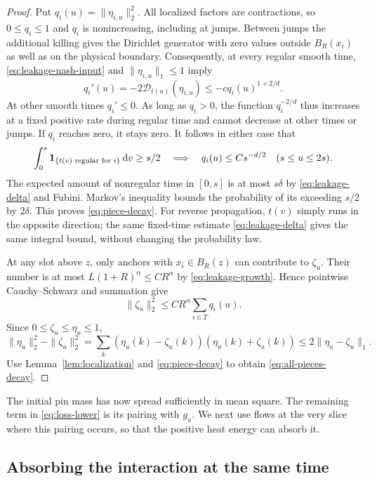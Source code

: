 \begin{proof}
Put $q_i(u)=\|\eta_{i,u}\|_2^2$.  All localized factors are
contractions, so $0\le q_i\le1$ and $q_i$ is nonincreasing,
including at jumps.  Between jumps the additional killing gives the
Dirichlet generator with zero values outside $B_R(x_i)$ as well as
on the physical boundary.  Consequently, at every regular smooth
time, \eqref{eq:leakage-nash-input} and
$\|\eta_{i,u}\|_1\le1$ imply
\begin{equation}\label{eq:nash-differential}
 q_i'(u)=-2\mathcal D_{t(u)}(\eta_{i,u})
                         \le-c q_i(u)^{1+2/d}.
\end{equation}
At other smooth times $q_i'\le0$.
As long as $q_i>0$, the function $q_i^{-2/d}$ thus increases at a
fixed positive rate during regular time and cannot decrease at other
times or jumps.  If $q_i$ reaches zero, it stays zero.  It follows in
either case that
\[
 \int_0^s\mathbf 1_{\{t(v)\text{ regular for }i\}}\,\mathrm dv\ge s/2
 \quad\Longrightarrow\quad
 q_i(u)\le C s^{-d/2}\quad(s\le u\le2s).
\]
The expected amount of nonregular time in $[0,s]$ is at most
$s\delta$ by \eqref{eq:leakage-delta} and Fubini.  Markov's
inequality bounds the probability of its exceeding $s/2$ by
$2\delta$.  This proves \eqref{eq:piece-decay}.  For reverse
propagation, $t(v)$ simply runs in the opposite direction; the same
fixed-time estimate \eqref{eq:leakage-delta} gives the same integral
bound, without changing the probability law.

At any slot above $z$, only anchors with $x_i\in B_R(z)$ can
contribute to $\zeta_u$.  Their number is at most
$L(1+R)^\alpha\le C R^\alpha$ by
\eqref{eq:leakage-growth}.  Hence pointwise Cauchy--Schwarz and
summation give
\[
                \|\zeta_u\|_2^2\le C R^\alpha\sum_{i\in T}q_i(u).
\]
Since $0\le\zeta_u\le\eta_u\le1$,
\[
 \|\eta_u\|_2^2-\|\zeta_u\|_2^2
       =\sum_k(\eta_u(k)-\zeta_u(k))(\eta_u(k)+\zeta_u(k))
       \le2\|\eta_u-\zeta_u\|_1.
\]
Use Lemma~\ref{lem:localization} and \eqref{eq:piece-decay} to
obtain \eqref{eq:all-pieces-decay}.
\end{proof}

The initial pin mass has now spread sufficiently in mean square.
The remaining term in \eqref{eq:loss-lower} is its pairing with
$g_u$.  We next use flows at the very slice where this pairing occurs,
so that the positive heat energy can absorb it.

\subsection{Absorbing the interaction at the same time}

